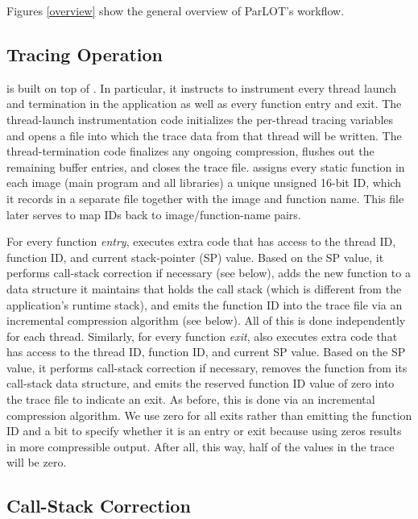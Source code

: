 

Figures \ref{overview} show the general overview of ParLOT's workflow.

\subsection{Tracing Operation}

\parlot is built on top of \pin. In particular, it instructs \pin to instrument every thread launch and termination in the application as well as every function entry and exit. The thread-launch instrumentation code initializes the per-thread tracing variables and opens a file into which the trace data from that thread will be written. The thread-termination code finalizes any ongoing compression, flushes out the remaining buffer entries, and closes the trace file. \parlot assigns every static function in each image (main program and all libraries) a unique unsigned 16-bit ID, which it records in a separate file together with the image and function name. This file later serves to map IDs back to image/function-name pairs.

For every function \emph{entry}, \parlot executes extra code that has access to the thread ID, function ID, and current stack-pointer (SP) value. Based on the SP value, it performs call-stack correction if necessary (see below), adds the new function to a data structure it maintains that holds the call stack (which is different from the application’s runtime stack), and emits the function ID into the trace file via an incremental compression algorithm (see below). All of this is done independently for each thread. Similarly, for every function \emph{exit}, \parlot also executes extra code that has access to the thread ID, function ID, and current SP value. Based on the SP value, it performs call-stack correction if necessary, removes the function from its call-stack data structure, and emits the reserved function ID value of zero into the trace file to indicate an exit. As before, this is done via an incremental compression algorithm. We use zero for all exits rather than emitting the function ID and a bit to specify whether it is an entry or exit because using zeros results in more compressible output. After all, this way, half of the values in the trace will be zero.

\subsection{Call-Stack Correction}

